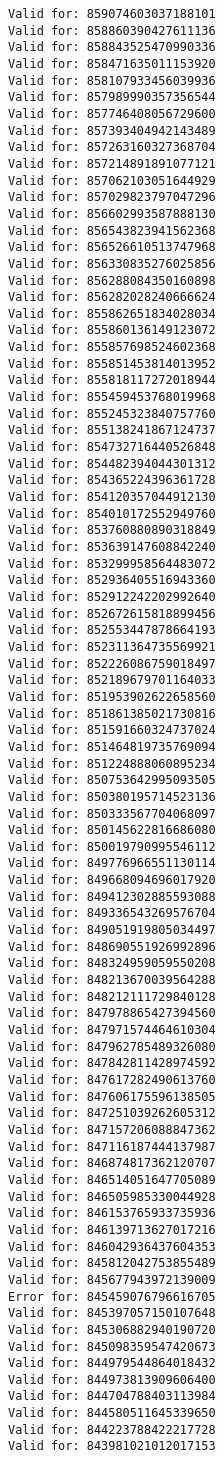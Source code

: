 \documentclass[11pt]{article}
\begin{document}
\begin{Verbatim}[commandchars=\\\{\}]
Valid for: 859074603037188101
Valid for: 858860390427611136
Valid for: 858843525470990336
Valid for: 858471635011153920
Valid for: 858107933456039936
Valid for: 857989990357356544
Valid for: 857746408056729600
Valid for: 857393404942143489
Valid for: 857263160327368704
Valid for: 857214891891077121
Valid for: 857062103051644929
Valid for: 857029823797047296
Valid for: 856602993587888130
Valid for: 856543823941562368
Valid for: 856526610513747968
Valid for: 856330835276025856
Valid for: 856288084350160898
Valid for: 856282028240666624
Valid for: 855862651834028034
Valid for: 855860136149123072
Valid for: 855857698524602368
Valid for: 855851453814013952
Valid for: 855818117272018944
Valid for: 855459453768019968
Valid for: 855245323840757760
Valid for: 855138241867124737
Valid for: 854732716440526848
Valid for: 854482394044301312
Valid for: 854365224396361728
Valid for: 854120357044912130
Valid for: 854010172552949760
Valid for: 853760880890318849
Valid for: 853639147608842240
Valid for: 853299958564483072
Valid for: 852936405516943360
Valid for: 852912242202992640
Valid for: 852672615818899456
Valid for: 852553447878664193
Valid for: 852311364735569921
Valid for: 852226086759018497
Valid for: 852189679701164033
Valid for: 851953902622658560
Valid for: 851861385021730816
Valid for: 851591660324737024
Valid for: 851464819735769094
Valid for: 851224888060895234
Valid for: 850753642995093505
Valid for: 850380195714523136
Valid for: 850333567704068097
Valid for: 850145622816686080
Valid for: 850019790995546112
Valid for: 849776966551130114
Valid for: 849668094696017920
Valid for: 849412302885593088
Valid for: 849336543269576704
Valid for: 849051919805034497
Valid for: 848690551926992896
Valid for: 848324959059550208
Valid for: 848213670039564288
Valid for: 848212111729840128
Valid for: 847978865427394560
Valid for: 847971574464610304
Valid for: 847962785489326080
Valid for: 847842811428974592
Valid for: 847617282490613760
Valid for: 847606175596138505
Valid for: 847251039262605312
Valid for: 847157206088847362
Valid for: 847116187444137987
Valid for: 846874817362120707
Valid for: 846514051647705089
Valid for: 846505985330044928
Valid for: 846153765933735936
Valid for: 846139713627017216
Valid for: 846042936437604353
Valid for: 845812042753855489
Valid for: 845677943972139009
Error for: 845459076796616705
Valid for: 845397057150107648
Valid for: 845306882940190720
Valid for: 845098359547420673
Valid for: 844979544864018432
Valid for: 844973813909606400
Valid for: 844704788403113984
Valid for: 844580511645339650
Valid for: 844223788422217728
Valid for: 843981021012017153

\end{Verbatim}
\end{document}

